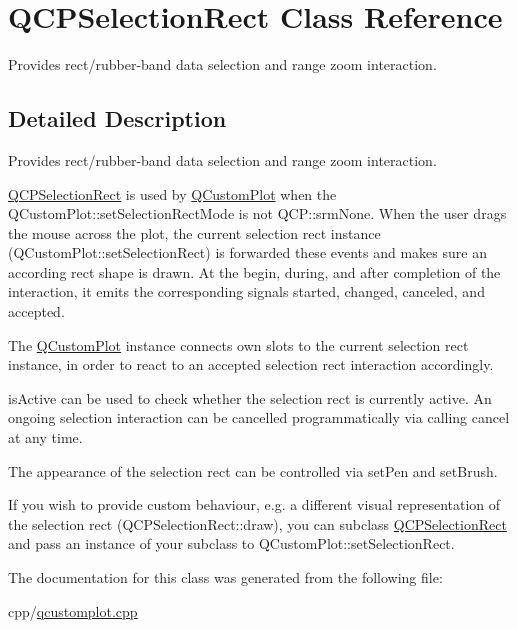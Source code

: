 \hypertarget{class_q_c_p_selection_rect}{}\section{Q\+C\+P\+Selection\+Rect Class Reference}
\label{class_q_c_p_selection_rect}


Provides rect/rubber-\/band data selection and range zoom interaction.  




\subsection{Detailed Description}
Provides rect/rubber-\/band data selection and range zoom interaction. 

\mbox{\hyperlink{class_q_c_p_selection_rect}{Q\+C\+P\+Selection\+Rect}} is used by \mbox{\hyperlink{class_q_custom_plot}{Q\+Custom\+Plot}} when the Q\+Custom\+Plot\+::set\+Selection\+Rect\+Mode is not Q\+C\+P\+::srm\+None. When the user drags the mouse across the plot, the current selection rect instance (Q\+Custom\+Plot\+::set\+Selection\+Rect) is forwarded these events and makes sure an according rect shape is drawn. At the begin, during, and after completion of the interaction, it emits the corresponding signals started, changed, canceled, and accepted.

The \mbox{\hyperlink{class_q_custom_plot}{Q\+Custom\+Plot}} instance connects own slots to the current selection rect instance, in order to react to an accepted selection rect interaction accordingly.

is\+Active can be used to check whether the selection rect is currently active. An ongoing selection interaction can be cancelled programmatically via calling cancel at any time.

The appearance of the selection rect can be controlled via set\+Pen and set\+Brush.

If you wish to provide custom behaviour, e.\+g. a different visual representation of the selection rect (Q\+C\+P\+Selection\+Rect\+::draw), you can subclass \mbox{\hyperlink{class_q_c_p_selection_rect}{Q\+C\+P\+Selection\+Rect}} and pass an instance of your subclass to Q\+Custom\+Plot\+::set\+Selection\+Rect. 

The documentation for this class was generated from the following file\+:\begin{DoxyCompactItemize}
\item 
cpp/\mbox{\hyperlink{qcustomplot_8cpp}{qcustomplot.\+cpp}}\end{DoxyCompactItemize}
